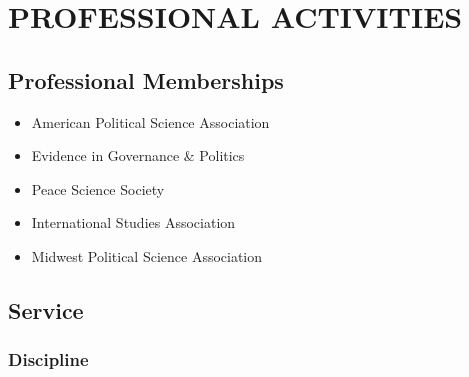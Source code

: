 \documentclass[10pt]{article}
\begin{document}
\section*{PROFESSIONAL ACTIVITIES}

\subsection*{Professional Memberships}

\begin{itemize}\setlength{\itemsep}{1pt}
\item American Political Science Association
\item Evidence in Governance \& Politics
\item Peace Science Society
\item International Studies Association
\item Midwest Political Science Association
\end{itemize}

\subsection*{Service}

\subsubsection*{Discipline}
\end{document}
